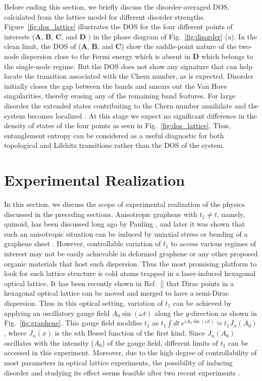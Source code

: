 \documentclass[aps,prb,showpacs,twocolumn,floats]{revtex4-1}
\begin{document}
Before ending this section, we briefly discuss the disorder-averaged DOS, calculated from the lattice model for different disorder strengths. 
Figure~\ref{fig:dos_lattice} illustrates the DOS for the four different points of interests ({\bf A}, {\bf B}, {\bf C}, and {\bf D} ) in the phase diagram of Fig.~\ref{fig:disorder} (a).
In the clean limit, the DOS of ({\bf A}, {\bf B}, and {\bf C}) show the saddle-point nature of the two-node dispersion close to the Fermi energy which is absent in {\bf D} which belongs to the single-node regime. But the DOS does not show any signature that can help locate the transition associated with the Chern number, as is expected. Disorder initially closes the gap between the bands and smears out the Van Hove singularities, thereby erasing any of the remaining band features. For large disorder the extended states contributing to the Chern number annihilate and the system becomes localized \cite{castro2016,masaru2007}. At this stage we expect no significant difference in the density of states of the four points as seen in Fig.~\eqref{fig:dos_lattice}. Thus, entanglement entropy can be considered as a useful diagnostic for both topological and Lifshitz transitions rather than the DOS of the system.

\section{Experimental Realization}
In this section, we discuss the scope of experimental realization of the physics discussed in the preceding sections. Anisotropic graphene with $t_1 \ne t$, namely, quinoid, has been discussed long ago by Pauling \cite{paul}, and later it was shown that such an anisotropic situation can be induced by uniaxial stress or bending of a graphene sheet \cite{ryad}. However, controllable variation of $t_1$ to access various regimes of interest may not be easily achievable in deformed graphene or any other proposed organic materials that host such dispersion. Thus the most promising platform to look for such lattice structure is cold atoms trapped in a laser-induced hexagonal optical lattice. It has been recently shown in Ref.~[] that Dirac points in a hexagonal optical lattice can be moved and merged to have a semi-Dirac dispersion. Thus in this optical setting, variation of $t_1$ can be  achieved by applying an oscillatory gauge field $A_0\sin(\omega t)$ along the $y$-direction as shown in Fig.~\ref{fig:graphene}. This gauge field modifies $t_1$ as $t_1 \int dt ~e^{i A_0  \sin(\omega t)} \simeq t_1 J_n(A_0)$, where $J_n(x)$ is the $n$th Bessel function of the first kind. Since $J_n(A_0)$ oscillates with the intensity ($A_0$) of the  gauge field, different limits of $t_1$ can be accessed in this experiment. Moreover, due to the high degree of controllability of most parameters in optical lattice experiments, the possibility of inducing disorder and studying its effect seems feasible after two recent  experiments \cite{billy,roati}.  
\end{document}
